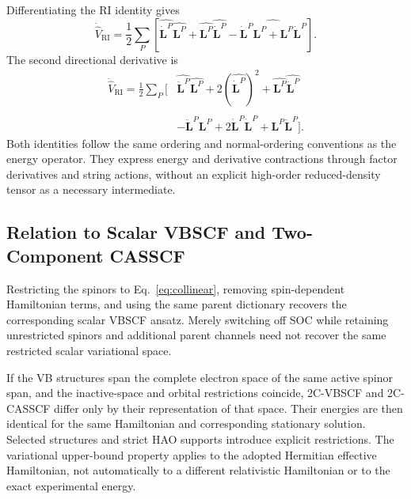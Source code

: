 \documentclass[12pt]{article}
\begin{document}
Differentiating the RI identity gives
\begin{equation}
 \dot{\hat V}_{\mathrm{RI}}=\frac12\sum_P
 \left[
 \widehat{\dot{\mathbf L}^P}\widehat{\mathbf L^P}
 +\widehat{\mathbf L^P}\widehat{\dot{\mathbf L}^P}
 -\widehat{\dot{\mathbf L}^P\mathbf L^P
                    +\mathbf L^P\dot{\mathbf L}^P}
 \right].
 \label{eq:riderivative}
\end{equation}
The second directional derivative is
\begin{equation}
 \begin{aligned}
 \ddot{\hat V}_{\mathrm{RI}}=\frac12\sum_P\big[&
 \widehat{\ddot{\mathbf L}^P}\widehat{\mathbf L^P}
 +2(\widehat{\dot{\mathbf L}^P})^2
 +\widehat{\mathbf L^P}\widehat{\ddot{\mathbf L}^P}\\
 &-\widehat{\ddot{\mathbf L}^P\mathbf L^P
            +2\dot{\mathbf L}^P\dot{\mathbf L}^P
            +\mathbf L^P\ddot{\mathbf L}^P}\big].
 \end{aligned}
 \label{eq:risecondderivative}
\end{equation}
Both identities follow the same ordering and normal-ordering conventions as the energy operator. They express energy and derivative contractions through factor derivatives and string actions, without an explicit high-order reduced-density tensor as a necessary intermediate.

\subsection{Relation to Scalar VBSCF and Two-Component CASSCF}

Restricting the spinors to Eq.~\eqref{eq:collinear}, removing spin-dependent Hamiltonian terms, and using the same parent dictionary recovers the corresponding scalar VBSCF ansatz. Merely switching off SOC while retaining unrestricted spinors and additional parent channels need not recover the same restricted scalar variational space.

If the VB structures span the complete electron space of the same active spinor span, and the inactive-space and orbital restrictions coincide, 2C-VBSCF and 2C-CASSCF differ only by their representation of that space. Their energies are then identical for the same Hamiltonian and corresponding stationary solution. Selected structures and strict HAO supports introduce explicit restrictions. The variational upper-bound property applies to the adopted Hermitian effective Hamiltonian, not automatically to a different relativistic Hamiltonian or to the exact experimental energy.
\end{document}
